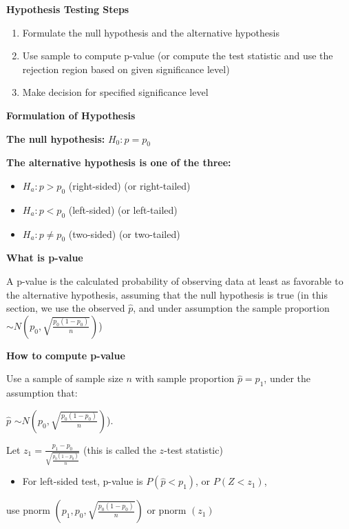 \documentclass[
]{book}
\providecommand{\tightlist}{%
  \setlength{\itemsep}{0pt}\setlength{\parskip}{0pt}}
\begin{document}
\textbf{Hypothesis Testing Steps}

\begin{enumerate}
\def\labelenumi{\arabic{enumi}.}
\tightlist
\item
  Formulate the null hypothesis and the alternative hypothesis
\item
  Use sample to compute p-value (or compute the test statistic and use the rejection region based on given significance level)
\item
  Make decision for specified significance level
\end{enumerate}

\textbf{Formulation of Hypothesis}

\textbf{The null hypothesis:} \(H_0: p = p_0\)

\textbf{The alternative hypothesis is one of the three:}

\begin{itemize}
\tightlist
\item
  \(H_a: p > p_0\) (right-sided) (or right-tailed)
\item
  \(H_a: p < p_0\) (left-sided) (or left-tailed)
\item
  \(H_a: p \neq p_0\) (two-sided) (or two-tailed)
\end{itemize}

\textbf{What is p-value}

A p-value is the calculated probability of observing data at least as favorable to the alternative hypothesis, assuming that the null hypothesis is true (in this section, we use the observed \(\hat{p}\), and under assumption the sample proportion \(\sim N(p_0, \sqrt{\frac{p_0(1-p_0)}{n}})\))

\textbf{How to compute p-value}

Use a sample of sample size \(n\) with sample proportion \(\hat{p}=p_1\), under the assumption that:

\(\hat{p}\) \(\sim N(p_0, \sqrt{\frac{p_0(1-p_0)}{n}})\)).

Let \(z_1 = \frac{p_1 - p_0}{\sqrt{\frac{p_0(1-p_0)}{n}}}\) (this is called the \(z\)-test statistic)

\begin{itemize}
\tightlist
\item
  For left-sided test, p-value is \(P(\hat{p} < p_1)\), or \(P(Z < z_1)\),
\end{itemize}

use pnorm \(({p_1, p_0,}{\sqrt{\frac{p_0(1-p_0)}{n}}})\) or pnorm \((z_1)\)
\end{document}
